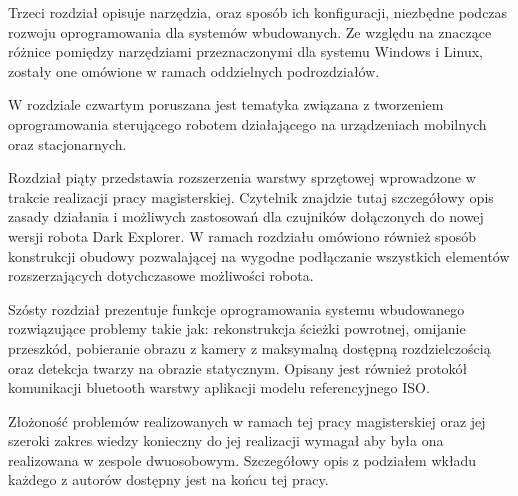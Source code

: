 Trzeci rozdział opisuje narzędzia, oraz sposób ich konfiguracji, niezbędne podczas rozwoju oprogramowania dla systemów wbudowanych. Ze względu na znaczące różnice pomiędzy narzędziami przeznaczonymi dla systemu Windows i Linux, zostały one omówione w ramach oddzielnych podrozdziałów. 

W rozdziale czwartym poruszana jest tematyka związana z tworzeniem oprogramowania sterującego robotem działającego na urządzeniach mobilnych oraz stacjonarnych. 

Rozdział piąty przedstawia rozszerzenia warstwy sprzętowej wprowadzone w trakcie realizacji pracy magisterskiej. Czytelnik znajdzie tutaj szczegółowy opis zasady działania i możliwych zastosowań dla czujników dołączonych do nowej wersji robota Dark Explorer. W ramach rozdziału omówiono również sposób konstrukcji obudowy pozwalającej na wygodne podłączanie wszystkich elementów    rozszerzających dotychczasowe możliwości robota. 

Szósty rozdział prezentuje funkcje oprogramowania systemu wbudowanego rozwiązujące problemy takie jak: rekonstrukcja ścieżki powrotnej, omijanie przeszkód, pobieranie obrazu z kamery z maksymalną dostępną rozdzielczością oraz detekcja twarzy na obrazie statycznym. Opisany jest również protokół komunikacji bluetooth warstwy aplikacji modelu referencyjnego ISO.

Złożoność problemów realizowanych w ramach tej pracy magisterskiej oraz jej szeroki zakres wiedzy konieczny do jej realizacji wymagał aby była ona realizowana w zespole dwuosobowym. Szczegółowy opis z podziałem wkładu każdego z autorów dostępny jest na końcu tej pracy.
